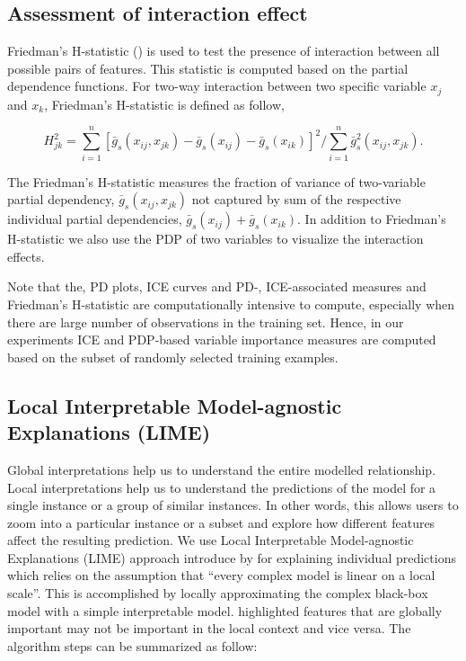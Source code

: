 \documentclass[11pt,a4paper,]{article}
\begin{document}
\subsection{Assessment of interaction
effect}\label{assessment-of-interaction-effect}

Friedman's H-statistic (\textcite{friedman2008predictive}) is used to
test the presence of interaction between all possible pairs of features.
This statistic is computed based on the partial dependence functions.
For two-way interaction between two specific variable \(x_j\) and
\(x_k\), Friedman's H-statistic is defined as follow,

\[H_{jk}^2=\sum_{i=1}^{n}[\bar{g}_{s}(x_{ij}, x_{jk})-\bar{g}_{s}(x_{ij})-\bar{g}_{s}(x_{ik})]^2/\sum_{i=1}^{n}\bar{g}^2_{s}(x_{ij}, x_{jk}).\]

The Friedman's H-statistic measures the fraction of variance of
two-variable partial dependency, \(\bar{g}_{s}(x_{ij}, x_{jk})\) not
captured by sum of the respective individual partial dependencies,
\(\bar{g}_{s}(x_{ij})+\bar{g}_{s}(x_{ik})\). In addition to Friedman's
H-statistic we also use the PDP of two variables to visualize the
interaction effects.

Note that the, PD plots, ICE curves and PD-, ICE-associated measures and
Friedman's H-statistic are computationally intensive to compute,
especially when there are large number of observations in the training
set. Hence, in our experiments ICE and PDP-based variable importance
measures are computed based on the subset of randomly selected training
examples.

\subsection{Local Interpretable Model-agnostic Explanations
(LIME)}\label{local-interpretable-model-agnostic-explanations-lime}

Global interpretations help us to understand the entire modelled
relationship. Local interpretations help us to understand the
predictions of the model for a single instance or a group of similar
instances. In other words, this allows users to zoom into a particular
instance or a subset and explore how different features affect the
resulting prediction. We use Local Interpretable Model-agnostic
Explanations (LIME) approach introduce by \textcite{ribeiro2016should}
for explaining individual predictions which relies on the assumption
that ``every complex model is linear on a local scale''. This is
accomplished by locally approximating the complex black-box model with a
simple interpretable model. \textcite{ribeiro2016should} highlighted
features that are globally important may not be important in the local
context and vice versa. The algorithm steps can be summarized as follow:
\end{document}
